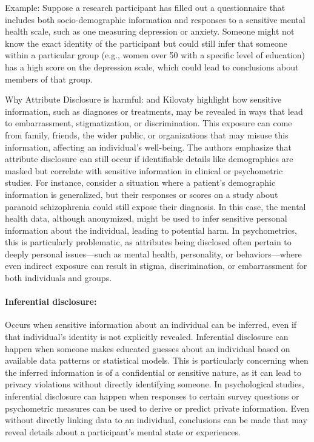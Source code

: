 \documentclass{article}
\begin{document}
Example: 
Suppose a research participant has filled out a questionnaire that includes both socio-demographic information and responses to a sensitive mental health scale, such as one measuring depression or anxiety. Someone might not know the exact identity of the participant but could still infer that someone within a particular group (e.g., women over 50 with a specific level of education) has a high score on the depression scale, which could lead to conclusions about members of that group.

Why Attribute Disclosure is harmful:
\cite{2022_Wairimu} and Kilovaty \cite{2021_Kilovaty} highlight how sensitive information, such as diagnoses or treatments, may be revealed in ways that lead to embarrassment, stigmatization, or discrimination. This exposure can come from family, friends, the wider public, or organizations that may misuse this information, affecting an individual’s well-being. The authors emphasize that attribute disclosure can still occur if identifiable details like demographics are masked but correlate with sensitive information in clinical or psychometric studies.
For instance, consider a situation where a patient's demographic information is generalized, but their responses or scores on a study about paranoid schizophrenia could still expose their diagnosis. In this case, the mental health data, although anonymized, might be used to infer sensitive personal information about the individual, leading to potential harm. In psychometrics, this is particularly problematic, as attributes being disclosed often pertain to deeply personal issues—such as mental health, personality, or behaviors—where even indirect exposure can result in stigma, discrimination, or embarrassment for both individuals and groups.
\color{black}

\paragraph{Inferential disclosure:}
Occurs when sensitive information about an individual can be inferred, even if that individual’s identity is not explicitly revealed. Inferential disclosure can happen when someone makes educated guesses about an individual based on available data patterns or statistical models. This is particularly concerning when the inferred information is of a confidential or sensitive nature, as it can lead to privacy violations without directly identifying someone.
In psychological studies, inferential disclosure can happen when responses to certain survey questions or psychometric measures can be used to derive or predict private information. Even without directly linking data to an individual, conclusions can be made that may reveal details about a participant’s mental state or experiences.
\end{document}

